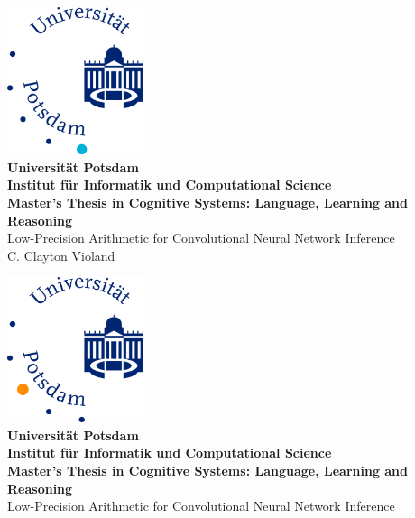 \documentclass[12pt]{report}
\begin{document}
\nocite{*} %
\hoffset=5mm
\thispagestyle{empty}

\begin{center}
	\bigskip \bigskip \bigskip 
	\includegraphics[width=0.30\textwidth]{figures/06_Matjpg.jpg} \\
	\vspace*{0.8cm}
	{\huge \bf Universität Potsdam} \\
	\bigskip \bigskip \bigskip
	{\huge \bf Institut für Informatik und Computational Science} \\
	\bigskip \bigskip \bigskip
	{\Large \bf Master's Thesis in Cognitive Systems: Language, Learning and Reasoning} \\
	\bigskip \bigskip \bigskip \bigskip \bigskip
	{\Large Low-Precision Arithmetic for Convolutional Neural Network Inference} \\        
	\bigskip \bigskip \bigskip \bigskip
	{\Large C. Clayton Violand} \\    
	\bigskip 
\end{center}

\vfill

\newpage
\hoffset=5mm
\thispagestyle{empty}

\begin{center}
	\bigskip \bigskip \bigskip 
	\includegraphics[width=0.30\textwidth]{figures/04_Humjpg.jpg} \\
	\vspace*{0.8cm}
	{\huge \bf Universität Potsdam} \\
	\bigskip \bigskip \bigskip
	{\huge \bf Institut für Informatik und Computational Science } \\
	\bigskip \bigskip \bigskip
	{\Large \bf Master's Thesis in Cognitive Systems: Language, Learning and Reasoning} \\
	\bigskip \bigskip \bigskip \bigskip \bigskip
	{\Large Low-Precision Arithmetic for Convolutional Neural Network Inference} \\
	\bigskip
\end{center}
\end{document}
